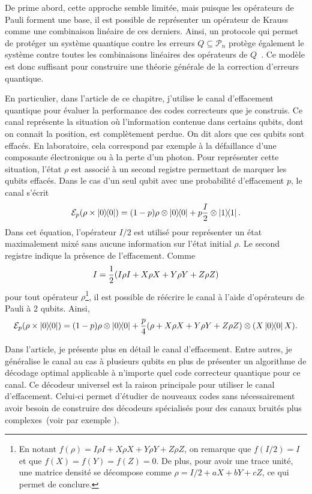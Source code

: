 De prime abord,
cette approche semble limitée,
mais puisque les opérateurs de Pauli forment une base,
il est possible de représenter un opérateur de Krauss
comme une combinaison linéaire de ces derniers.
Ainsi,
un protocole qui permet de protéger un système quantique contre les erreurs 
$Q \subseteq \mathcal P_n$ protège également le système contre toutes les 
combinaisons linéaires des opérateurs de $Q$~\cite{knill_theory_1997}.
Ce modèle est donc suffisant pour construire une théorie générale de la correction d'erreurs quantique.

En particulier,
dans l'article de ce chapitre,
j'utilise le canal d'effacement quantique pour évaluer la performance
des codes correcteurs que je construis.
Ce canal représente la situation où l'information contenue dans certains qubits,
dont on connait la position, est complètement perdue.
On dit alors que ces qubits sont effacés.
En laboratoire, cela correspond par exemple à la défaillance d'une composante électronique
ou à la perte d'un photon.
Pour représenter cette situation, l'état $\rho$ est associé à un second registre
permettant de marquer les qubits effacés.
Dans le cas d'un seul qubit avec une probabilité d'effacement $p$,
le canal s'écrit
\begin{equation}
  \mathcal E_p(\rho \times \op{0}) 
  = (1 - p) \rho \otimes \op{0} + p \frac{I}{2} \otimes \op{1}.
\end{equation}
Dans cet équation,
l'opérateur $I/2$ est utilisé pour représenter un état maximalement mixé
sans aucune information sur l'état initial $\rho$.
Le second registre indique la présence de l'effacement.
Comme 
\begin{align}
  I = \frac{1}{2} \qty(
  I\rho I + X \rho X + Y \rho Y + Z \rho Z
)
\end{align}
pour tout opérateur $\rho$\footnote{
  En notant $f(\rho) = I\rho I + X\rho X + Y \rho Y + Z \rho Z$,
  on remarque que $f(I/2) = I$ et que $f(X) = f(Y) = f(Z) = 0$.
  De plus,
  pour avoir une trace unité,
  une matrice densité se décompose comme $\rho = I/2 + aX + bY + cZ$,
  ce qui permet de conclure.
},
il est possible de réécrire le canal à l'aide d'opérateurs de Pauli à 2 qubits.
Ainsi,
\begin{equation}
  \mathcal E_p(\rho \times \op{0}) 
  = \qty(1 -  p) \rho \otimes \op{0} + \frac{p}{4} \qty(\rho + X \rho X + Y \rho Y + Z \rho Z)\otimes \qty(X\op{0}X).
\end{equation}

Dans l'article,
je présente plus en détail le canal d'effacement.
Entre autres,
je généralise le canal au cas à plusieurs qubits
en plus de présenter un algorithme de décodage optimal applicable à n'importe quel
code correcteur quantique pour ce canal.
Ce décodeur universel est la raison principale pour utiliser le canal d'effacement.
Celui-ci permet d'étudier de nouveaux codes sans nécessairement avoir besoin de construire des 
décodeurs spécialisés pour des canaux bruités plus complexes~(voir par exemple \cite{pastawski_holographic_2015, gullans_quantum_2021}).

